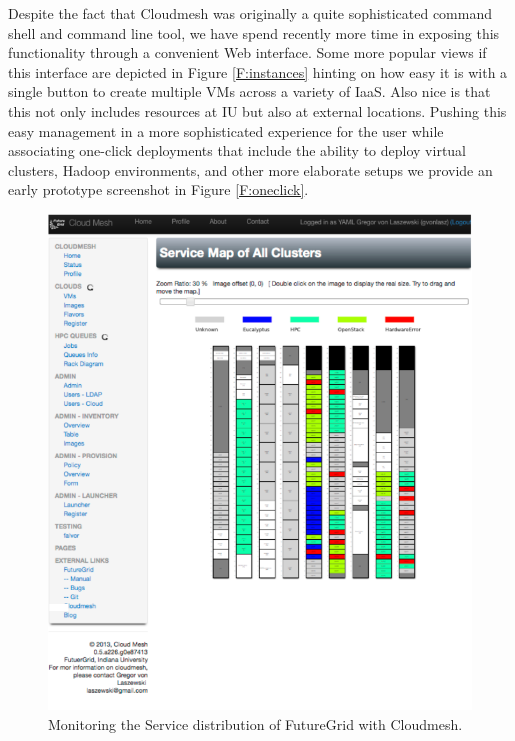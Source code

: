 \documentclass{tex/sig-alternate-2013}
\begin{document}
Despite the fact that Cloudmesh was originally a quite sophisticated command shell and command line tool, we have spend recently more time in exposing this functionality through a convenient Web interface. Some more popular views if this interface are depicted in Figure \ref{F:instances} hinting on how easy it is with a single button to create multiple VMs across a variety of IaaS. Also nice is that this not only includes resources at IU but also at external locations. Pushing this easy management in a more sophisticated experience for the user while associating one-click deployments that include the ability to deploy virtual clusters, Hadoop environments, and other more elaborate setups we provide an early prototype screenshot in Figure \ref{F:oneclick}.


\begin{figure}[htb]
  \centering
    \includegraphics[width=1.0\columnwidth]{images/rainbow.pdf}
  \caption{Monitoring the Service distribution of FutureGrid with Cloudmesh.}
\end{figure}
\end{document}
